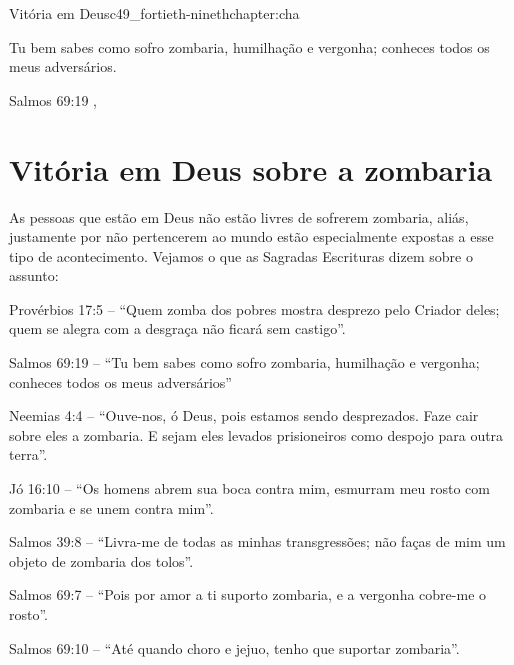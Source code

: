 \begin{chapterpage}{Vitória em Deus}{c49_fortieth-ninethchapter:cha}
 
\begin{myquotation}Tu bem sabes como sofro zombaria, humilhação e vergonha; conheces todos os meus adversários.
\par\vspace*{15mm}
\mbox{}\hfill \emdash{}Salmos 69:19
, %
\par\end{myquotation}

\end{chapterpage}



\section{Vitória em Deus sobre a zombaria}\label{c1_basicformatting:sec}

\emdash{}As pessoas que estão em Deus não estão livres de sofrerem zombaria, aliás, justamente por não pertencerem ao mundo estão especialmente expostas a esse tipo de acontecimento. Vejamos o que as Sagradas Escrituras dizem sobre o assunto:

\emdash{}Provérbios 17:5 – ``Quem zomba dos pobres mostra desprezo pelo Criador deles; quem se alegra com a desgraça não ficará sem castigo”.

\emdash{}Salmos 69:19 – ``Tu bem sabes como sofro zombaria, humilhação e vergonha; conheces todos os meus adversários”

\emdash{}Neemias 4:4 – ``Ouve-nos, ó Deus, pois estamos sendo desprezados. Faze cair sobre eles a zombaria. E sejam eles levados prisioneiros como despojo para outra terra”.

\emdash{}Jó 16:10 – ``Os homens abrem sua boca contra mim, esmurram meu rosto com zombaria e se unem contra mim”.

\emdash{}Salmos 39:8 – ``Livra-me de todas as minhas transgressões; não faças de mim um objeto de zombaria dos tolos”.

\emdash{}Salmos 69:7 – ``Pois por amor a ti suporto zombaria, e a vergonha cobre-me o rosto”.

\emdash{}Salmos 69:10 – ``Até quando choro e jejuo, tenho que suportar zombaria”.

